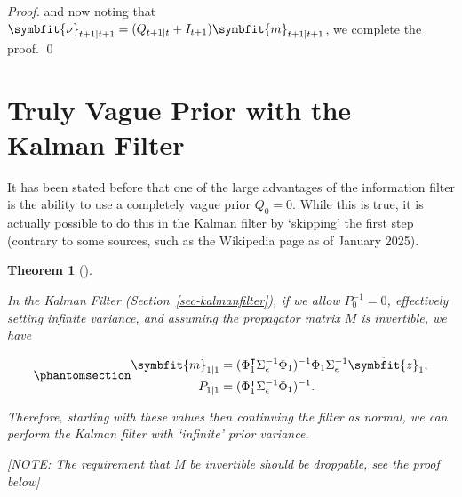 \documentclass[
]{report}
\newcommand{\bv}[1]{\symbfit{#1}}
\theoremstyle{plain}
\theoremstyle{plain}
\newtheorem{theorem}{Theorem}[section]
\theoremstyle{plain}
\theoremstyle{remark}
\begin{document}
\begin{proof}
and now noting that
\(\bv\nu_{t+1\mid t+1} = (Q_{t+1\mid t} + I_{t+1}) \bv m_{t+1\mid t+1}\),
we complete the proof. \qed
\end{proof}

\section{Truly Vague Prior with the Kalman Filter}\label{sec-vagueprior}

It has been stated before that one of the large advantages of the
information filter is the ability to use a completely vague prior
\(Q_{0}=0\). While this is true, it is actually possible to do this in
the Kalman filter by `skipping' the first step (contrary to some
sources, such as the Wikipedia page as of January 2025).

\begin{theorem}[]\protect\hypertarget{thm-vagueprior}{}\label{thm-vagueprior}

In the Kalman Filter (Section~\ref{sec-kalmanfilter}), if we allow
\(P_{0}^{-1} = 0\), effectively setting infinite variance, and assuming
the propagator matrix \(M\) is invertible, we have

\begin{equation}\phantomsection\label{eq-kalmanvague}{\begin{split}
  \bv m_{1\mid1} &= (\Phi_1^\intercal \Sigma_\epsilon^{-1} \Phi_1)^{-1} \Phi_1 \Sigma_\epsilon^{-1} \tilde{\bv z}_1,\\
  P_{1\mid1} &= (\Phi_1^\intercal \Sigma_\epsilon^{-1} \Phi_1)^{-1}.
\end{split}
}\end{equation}

Therefore, starting with these values then continuing the filter as
normal, we can perform the Kalman filter with `infinite' prior variance.

{{[}NOTE: The requirement that M be invertible should be droppable, see
the proof below{]}}

\end{theorem}
\end{document}
